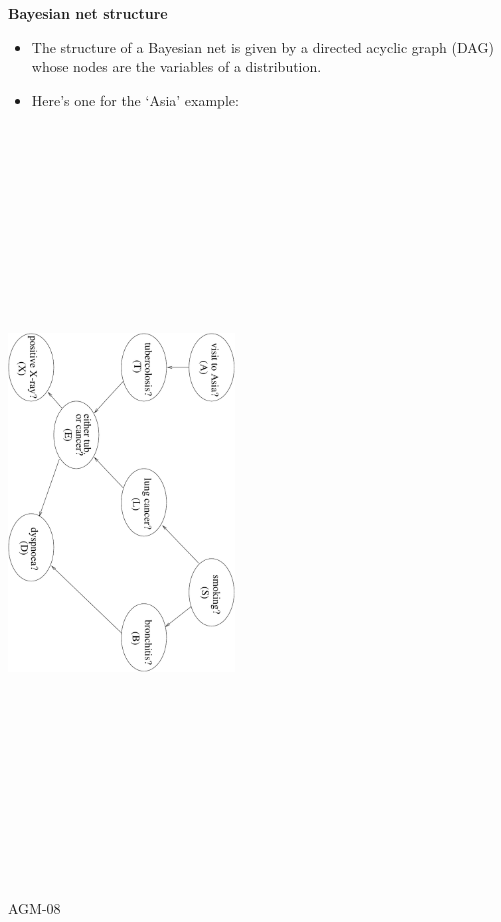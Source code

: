 \documentclass[landscape]{slides}
\newcommand{\lecnum}{AGM-08}
\newcommand{\slidehead}[1]{{\centering \bf #1 \\}}
\newenvironment{titledslide}[1]{\begin{slide}\slidehead{#1}\vfill}{\vfill \tiny \lecnum \end{slide}}
\begin{document}
\begin{titledslide}{Bayesian net structure}
  
  \begin{itemize}
  \item The structure of a Bayesian net is given by a directed acyclic
    graph (DAG) whose nodes are the variables of a distribution.
  \item Here's one for the `Asia' example:
  \end{itemize}

  \includegraphics[width=6cm,height=20cm,angle=90]{asia.pdf}

\end{titledslide}
\end{document}
